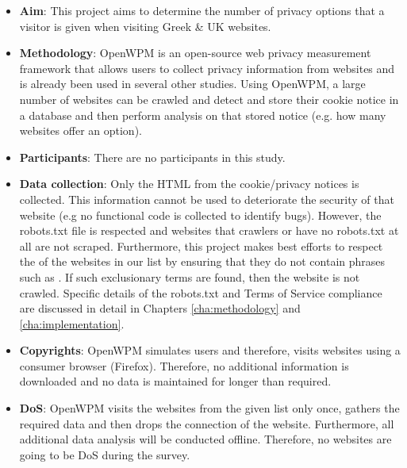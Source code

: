 \documentclass[../main.tex]{subfiles}
\begin{document}
\begin{itemize}
    \setlength\itemsep{1em}

    \item \textbf{Aim}: This project aims to determine the number of privacy options that a visitor is given when visiting Greek \& UK websites. 

    \item \textbf{Methodology}: OpenWPM is an open-source web privacy measurement framework that allows users to collect privacy information from websites and is already been used in several other studies. Using OpenWPM, a large number of websites can be crawled and detect and store their cookie notice in a database and then perform analysis on that stored notice (e.g. how many websites offer an  option).

    \item \textbf{Participants}: There are no participants in this study.

    \item \textbf{Data collection}: Only the HTML from the cookie/privacy notices is collected. This information cannot be used to deteriorate the security of that website (e.g no functional code is collected to identify bugs). However, the robots.txt file is respected and websites that  crawlers or have no robots.txt at all are not scraped. Furthermore, this project makes best efforts to respect the  of the websites in our list by ensuring that they do not contain phrases such as . If such exclusionary terms are found, then the website is not crawled. Specific details of the robots.txt and Terms of Service compliance are discussed in detail in Chapters \ref{cha:methodology} and \ref{cha:implementation}.

    \item \textbf{Copyrights}: OpenWPM simulates  users and therefore, visits websites using a consumer browser (Firefox). Therefore, no additional information is downloaded and no data is maintained for longer than required.

    \item \textbf{DoS}: OpenWPM visits the websites from the given list only once, gathers the required data and then drops the connection of the website. Furthermore, all additional data analysis will be conducted offline. Therefore, no websites are going to be DoS during the survey.
\end{itemize}
\end{document}
